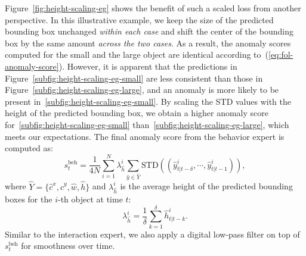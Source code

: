 Figure~\ref{fig:height-scaling-eg} shows the benefit of such a scaled loss from another perspective. In this illustrative example, we keep the size of the predicted bounding box unchanged \textit{within each case} and shift the center of the bounding box by the same amount \textit{across the two cases}. As a result, the anomaly scores computed for the small and the large object are identical according to~(\ref{eq:fol-anomaly-score}). However, it is apparent that the predictions in Figure~\ref{subfig:height-scaling-eg-small} are less consistent than those in Figure~\ref{subfig:height-scaling-eg-large}, and an anomaly is more likely to be present in~\ref{subfig:height-scaling-eg-small}. By scaling the STD values with the height of the predicted bounding box, we obtain a higher anomaly score for~\ref{subfig:height-scaling-eg-small} than~\ref{subfig:height-scaling-eg-large}, which meets our expectations. The final anomaly score from the behavior expert is computed as:
\begin{equation}
s_t^\text{beh} = \frac{1}{4N} \sum_{i=1}^N \lambda_{\hat{h}}^i \sum_{\hat{y} \in \hat{Y}} \text{STD} ((\hat{y}_{t|t - \delta}^i, \cdots, \hat{y}_{t|t - 1}^i)),
\end{equation}
where $\hat{Y} = \{\hat{c}^x,\hat{c}^y,\hat{w},\hat{h}\}$ and $\lambda_{\hat{h}}^i$ is the average height of the predicted bounding boxes for the $i$-th object at time $t$:
\begin{equation}
\lambda_{\hat{h}}^i = \frac{1}{\delta} \sum_{k=1}^\delta \hat{h}_{t|t - k}^i.
\end{equation}
Similar to the interaction expert, we also apply a digital low-pass filter on top of $s_t^\text{beh}$ for smoothness over time.